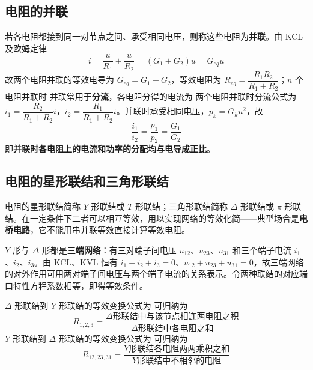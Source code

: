 \subsection{电阻的并联}
若各电阻都接到同一对节点之间、承受相同电压，则称这些电阻为\textbf{并联}。由 KCL 及欧姆定律
\begin{equation}
i=\frac{u}{R_1}+\frac{u}{R_2}=(G_1+G_2)u=G_{eq}u
\end{equation}
故两个电阻并联的等效电导为 $G_{eq}=G_1+G_2$，等效电阻为 $R_{eq}=\dfrac{R_1R_2}{R_1+R_2}$；$n$ 个电阻并联时
并联常用于\textbf{分流}，各电阻分得的电流为
两个电阻并联时分流公式为 $i_1=\dfrac{R_2}{R_1+R_2}i$，$i_2=\dfrac{R_1}{R_1+R_2}i$。并联时承受相同电压，$p_k=G_ku^2$，故
\begin{equation}
\frac{i_1}{i_2}=\frac{p_1}{p_2}=\frac{G_1}{G_2}
\end{equation}
即\textbf{并联时各电阻上的电流和功率的分配均与电导成正比}。


\subsection{电阻的星形联结和三角形联结}
电阻的星形联结简称 $Y$ 形联结或 $T$ 形联结；三角形联结简称 $\Delta$ 形联结或 $\pi$ 形联结。在一定条件下二者可以相互等效，用以实现网络的等效化简——典型场合是\textbf{电桥电路}，它不能用串并联等效直接计算等效电阻。

$Y$ 形与 $\Delta$ 形都是\textbf{三端网络}：有三对端子间电压 $u_{12}$、$u_{23}$、$u_{31}$ 和三个端子电流 $i_1$、$i_2$、$i_3$。由 KCL、KVL 恒有 $i_1+i_2+i_3=0$、$u_{12}+u_{23}+u_{31}=0$，故三端网络的对外作用可用两对端子间电压与两个端子电流的关系表示。令两种联结的对应端口特性方程系数相等，即得等效条件。

$\Delta$ 形联结到 $Y$ 形联结的等效变换公式为
可归纳为
\begin{equation}
R_{1,2,3}=\frac{\Delta\text{形联结中与该节点相连两电阻之积}}{\Delta\text{形联结中各电阻之和}}
\end{equation}
$Y$ 形联结到 $\Delta$ 形联结的等效变换公式为
可归纳为
\begin{equation}
R_{12,23,31}=\frac{Y\text{形联结各电阻两两乘积之和}}{Y\text{形联结中不相邻的电阻}}
\end{equation}

